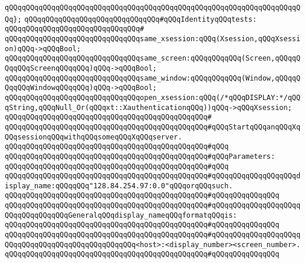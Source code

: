 \verb|qQQqqQQqqQQqqQQqqQQqqQQqqQQqqQQqqQQqqQQqqQQqqQQqqQQqqQQqqQQqqQQqqQQqqQQq};|\newline
\newline
\verb|qQQqqQQqqQQqqQQqqQQqqQQqqQQqqQQq#qQQqIdentityqQQqtests:|\newline
\verb|qQQqqQQqqQQqqQQqqQQqqQQqqQQqqQQq#|\newline
\verb|qQQqqQQqqQQqqQQqqQQqqQQqqQQqqQQqsame_xsession:qQQq(Xsession,qQQqXsession)qQQq->qQQqBool;|\newline
\verb|qQQqqQQqqQQqqQQqqQQqqQQqqQQqqQQqsame_screen:qQQqqQQqqQQq(Screen,qQQqqQQqqQQqScreenqQQqqQQq)qQQq->qQQqBool;|\newline
\verb|qQQqqQQqqQQqqQQqqQQqqQQqqQQqqQQqsame_window:qQQqqQQqqQQq(Window,qQQqqQQqqQQqWindowqQQqqQQq)qQQq->qQQqBool;|\newline
\newline
\verb|qQQqqQQqqQQqqQQqqQQqqQQqqQQqqQQqopen_xsession:qQQq(/*qQQqDISPLAY:*/qQQqString,qQQqNull_Or(qQQqxt::XauthenticationqQQq))qQQq->qQQqXsession;|\newline
\verb|qQQqqQQqqQQqqQQqqQQqqQQqqQQqqQQqqQQqqQQqqQQqqQQq#|\newline
\verb|qQQqqQQqqQQqqQQqqQQqqQQqqQQqqQQqqQQqqQQqqQQqqQQq#qQQqStartqQQqanqQQqXqQQqsessionqQQqwithqQQqsomeqQQqXqQQqserver.|\newline
\verb|qQQqqQQqqQQqqQQqqQQqqQQqqQQqqQQqqQQqqQQqqQQqqQQq#qQQq|\newline
\verb|qQQqqQQqqQQqqQQqqQQqqQQqqQQqqQQqqQQqqQQqqQQqqQQq#qQQqParameters:|\newline
\verb|qQQqqQQqqQQqqQQqqQQqqQQqqQQqqQQqqQQqqQQqqQQqqQQq#qQQq|\newline
\verb|qQQqqQQqqQQqqQQqqQQqqQQqqQQqqQQqqQQqqQQqqQQqqQQq#qQQqqQQqqQQqqQQqqQQqdisplay_name:qQQqqQQq"128.84.254.97:0.0"qQQqorqQQqsuch.|\newline
\verb|qQQqqQQqqQQqqQQqqQQqqQQqqQQqqQQqqQQqqQQqqQQqqQQq#qQQqqQQqqQQqqQQq|\newline
\verb|qQQqqQQqqQQqqQQqqQQqqQQqqQQqqQQqqQQqqQQqqQQqqQQq#qQQqqQQqqQQqqQQqqQQqqQQqqQQqqQQqqQQqGeneralqQQqdisplay_nameqQQqformatqQQqis:|\newline
\verb|qQQqqQQqqQQqqQQqqQQqqQQqqQQqqQQqqQQqqQQqqQQqqQQq#qQQqqQQqqQQqqQQq|\newline
\verb|qQQqqQQqqQQqqQQqqQQqqQQqqQQqqQQqqQQqqQQqqQQqqQQq#qQQqqQQqqQQqqQQqqQQqqQQqqQQqqQQqqQQqqQQqqQQqqQQqqQQq<host>:<display_number><screen_number>.|\newline
\verb|qQQqqQQqqQQqqQQqqQQqqQQqqQQqqQQqqQQqqQQqqQQqqQQq#qQQqqQQqqQQqqQQq|\newline

